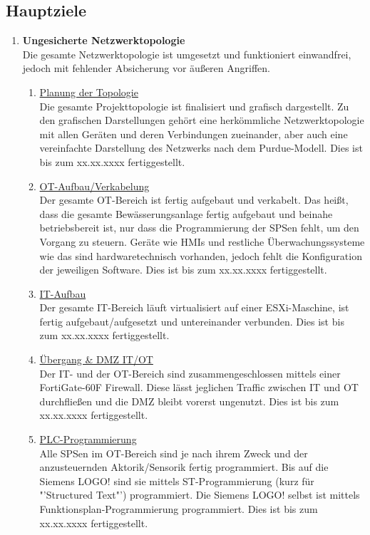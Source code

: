 \documentclass[
	headings=optiontotocandhead,%
	oneside,
	numbers=noenddot,%
	toc=flat, %
	10pt, %
	parskip=full, %
	listof=totoc, %
	listof=flat, %
	numbers=noenddot, %
	bibliography=totoc, %
	a4paper,DIV=14,
]{scrartcl}
\begin{document}
\subsection{Hauptziele}
\begin{enumerate}[start=1,label={\bfseries Ziel-H \arabic*},leftmargin=*,wide]
\item{\bfseries{Ungesicherte Netzwerktopologie}}\\
Die gesamte Netzwerktopologie ist umgesetzt und funktioniert einwandfrei, jedoch mit fehlender Absicherung vor äußeren Angriffen.
\begin{enumerate}[label=\alph*.]
\item{\underline{Planung der Topologie}}\\
Die gesamte Projekttopologie ist finalisiert und grafisch dargestellt. Zu den grafischen Darstellungen gehört eine herkömmliche Netzwerktopologie mit allen Geräten und deren Verbindungen zueinander, aber auch eine vereinfachte Darstellung des Netzwerks nach dem Purdue-Modell. Dies ist bis zum xx.xx.xxxx fertiggestellt.

\item{\underline{OT-Aufbau/Verkabelung}}\\
Der gesamte OT-Bereich ist fertig aufgebaut und verkabelt. Das heißt, dass die gesamte Bewässerungsanlage fertig aufgebaut und beinahe betriebsbereit ist, nur dass die Programmierung der SPSen fehlt, um den Vorgang zu steuern. Geräte wie HMIs und restliche Überwachungssysteme wie das sind hardwaretechnisch vorhanden, jedoch fehlt die Konfiguration der jeweiligen Software. Dies ist bis zum xx.xx.xxxx fertiggestellt.

\item{\underline{IT-Aufbau}}\\
Der gesamte IT-Bereich läuft virtualisiert auf einer ESXi-Maschine, ist fertig aufgebaut/aufgesetzt und untereinander verbunden. Dies ist bis zum xx.xx.xxxx fertiggestellt.

\item{\underline{Übergang \& DMZ IT/OT}}\\
Der IT- und der OT-Bereich sind zusammengeschlossen mittels einer FortiGate-60F Firewall. Diese lässt jeglichen Traffic zwischen IT und OT durchfließen und die DMZ bleibt vorerst ungenutzt. Dies ist bis zum xx.xx.xxxx fertiggestellt.

\item{\underline{PLC-Programmierung}}\\
Alle SPSen im OT-Bereich sind je nach ihrem Zweck und der anzusteuernden Aktorik/Sensorik fertig programmiert. Bis auf die Siemens LOGO! sind sie mittels ST-Programmierung (kurz für "'Structured Text"') programmiert. Die Siemens LOGO! selbst ist mittels Funktionsplan-Programmierung programmiert. Dies ist bis zum xx.xx.xxxx fertiggestellt.


\end{enumerate}
\end{enumerate}
\end{document}
